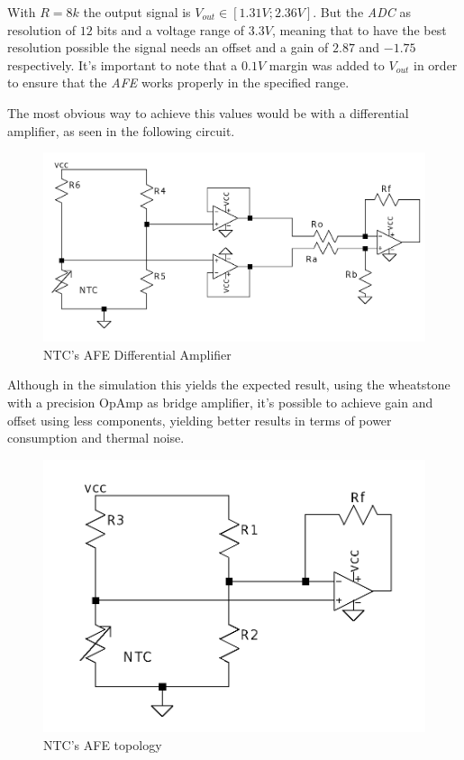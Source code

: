 \documentclass[12pt]{article}
\begin{document}
    With $R=8k$ the output signal is $V_{out} \in [1.31V;2.36V]$. 
    But the \textit{ADC} as resolution of $12$ bits and a voltage range of $3.3V$, meaning that to have the best resolution possible the signal needs an offset and a gain of $2.87$ and $-1.75$ respectively. 
    It's important to note that a $0.1V$ margin was added to $V_{out}$ in order to ensure that the \textit{AFE} works properly in the specified range.
    
    The most obvious way to achieve this values would be with a differential amplifier, 
    as seen in the following circuit.

     \begin{figure}[H] 
        \centering
        \includegraphics*[scale = 0.25]{images/AFENTCDiffAmp.png}
        \caption{NTC's AFE Differential Amplifier}
        \label{wrap-fig:1}
    \end{figure}

    Although in the simulation this yields the expected result, using the wheatstone with a precision OpAmp as bridge amplifier, it's possible to achieve gain and offset using less components, yielding better results in terms of power consumption and thermal noise. 

    
    \begin{figure}[H] 
        \centering
        \includegraphics*[scale = 0.25]{images/AFENTC.png}
        \caption{NTC's AFE topology}
        \label{wrap-fig:1}
    \end{figure}
\end{document}
